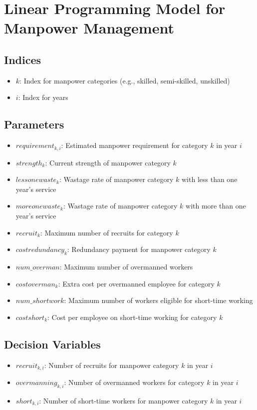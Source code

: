 \documentclass{article}
\begin{document}
\section*{Linear Programming Model for Manpower Management}

\subsection*{Indices}
\begin{itemize}
    \item $k$: Index for manpower categories (e.g., skilled, semi-skilled, unskilled)
    \item $i$: Index for years
\end{itemize}

\subsection*{Parameters}
\begin{itemize}
    \item $requirement_{k,i}$: Estimated manpower requirement for category $k$ in year $i$
    \item $strength_{k}$: Current strength of manpower category $k$
    \item $lessonewaste_{k}$: Wastage rate of manpower category $k$ with less than one year's service
    \item $moreonewaste_{k}$: Wastage rate of manpower category $k$ with more than one year's service
    \item $recruit_{k}$: Maximum number of recruits for category $k$
    \item $costredundancy_{k}$: Redundancy payment for manpower category $k$
    \item $num\_overman$: Maximum number of overmanned workers
    \item $costoverman_{k}$: Extra cost per overmanned employee for category $k$
    \item $num\_shortwork$: Maximum number of workers eligible for short-time working
    \item $costshort_{k}$: Cost per employee on short-time working for category $k$
\end{itemize}

\subsection*{Decision Variables}
\begin{itemize}
    \item $recruit_{k,i}$: Number of recruits for manpower category $k$ in year $i$
    \item $overmanning_{k,i}$: Number of overmanned workers for category $k$ in year $i$
    \item $short_{k,i}$: Number of short-time workers for manpower category $k$ in year $i$
\end{itemize}
\end{document}
